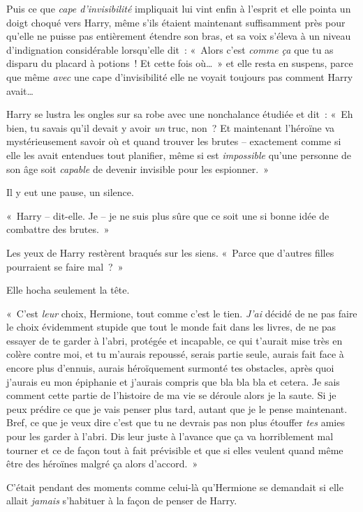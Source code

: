 Puis ce que \emph{cape d'invisibilité} impliquait lui vint enfin à l'esprit et elle pointa un doigt choqué vers Harry, même s'ils étaient maintenant suffisamment près pour qu'elle ne puisse pas entièrement étendre son bras, et sa voix s'éleva à un niveau d'indignation considérable lorsqu'elle dit~: «~Alors c'est \emph{comme ça} que tu as disparu du placard à potions~!
Et cette fois où…~»
et elle resta en suspens, parce que même \emph{avec} une cape d'invisibilité elle ne voyait toujours pas comment Harry avait…

Harry se lustra les ongles sur sa robe avec une nonchalance étudiée et dit~: «~Eh bien, tu savais qu'il devait y avoir \emph{un} truc, non~?
Et maintenant l'héroïne va mystérieusement savoir où et quand trouver les brutes -- exactement comme si elle les avait entendues tout planifier, même si est \emph{impossible} qu'une personne de son âge soit \emph{capable} de devenir invisible pour les espionner.~»

Il y eut une pause, un silence.

«~Harry -- dit-elle.
Je -- je ne suis plus sûre que ce soit une si bonne idée de combattre des brutes.~»

Les yeux de Harry restèrent braqués sur les siens.
«~Parce que d'autres filles pourraient se faire mal~?~»

Elle hocha seulement la tête.

«~C'est \emph{leur} choix, Hermione, tout comme c'est le tien.
\emph{J'ai} décidé de ne pas faire le choix évidemment stupide que tout le monde fait dans les livres, de ne pas essayer de te garder à l'abri, protégée et incapable, ce qui t'aurait mise très en colère contre moi, et tu m'aurais repoussé, serais partie seule, aurais fait face à encore plus d'ennuis, aurais héroïquement surmonté tes obstacles, après quoi j'aurais eu mon épiphanie et j'aurais compris que bla bla bla et cetera.
Je sais comment cette partie de l'histoire de ma vie se déroule alors je la saute.
Si je peux prédire ce que je vais penser plus tard, autant que je le pense maintenant.
Bref, ce que je veux dire c'est que tu ne devrais pas non plus étouffer \emph{tes} amies pour les garder à l'abri.
Dis leur juste à l'avance que ça va horriblement mal tourner et ce de façon tout à fait prévisible et que si elles veulent quand même être des héroïnes malgré ça alors d'accord.~»

C'était pendant des moments comme celui-là qu'Hermione se demandait si elle allait \emph{jamais} s'habituer à la façon de penser de Harry.

